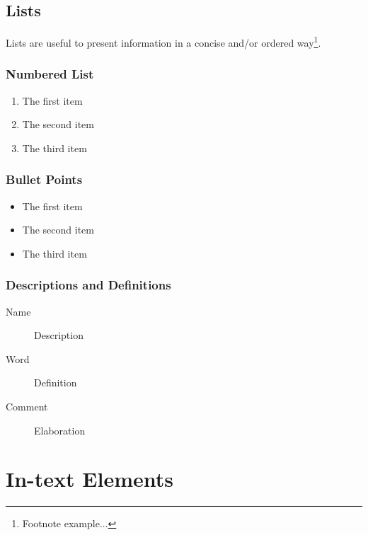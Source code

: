 \documentclass[11pt,fleqn]{book} %
\begin{document}
\section{Lists}

Lists are useful to present information in a concise and/or ordered way\footnote{Footnote example...}.

\subsection{Numbered List}

\begin{enumerate}
\item The first item
\item The second item
\item The third item
\end{enumerate}

\subsection{Bullet Points}

\begin{itemize}
\item The first item
\item The second item
\item The third item
\end{itemize}

\subsection{Descriptions and Definitions}

\begin{description}
\item[Name] Description
\item[Word] Definition
\item[Comment] Elaboration
\end{description}


\chapter{In-text Elements}
\end{document}
